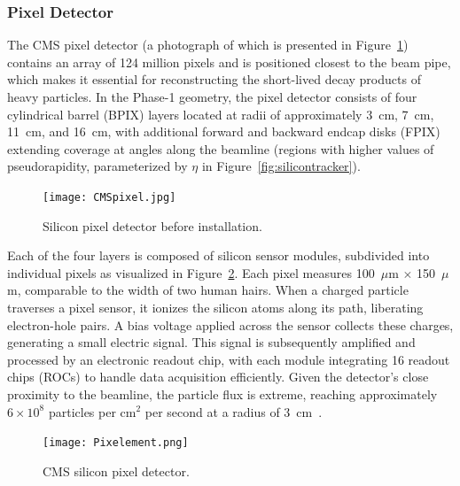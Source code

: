 \subsubsection{Pixel Detector}

The CMS pixel detector (a photograph of which is presented in Figure~\ref{fig:CMSpixel}) contains an array of 124 million pixels and is positioned closest to the beam pipe, which makes it essential for reconstructing the short-lived decay products of heavy particles. In the Phase-1 geometry, the pixel detector consists of four cylindrical barrel (BPIX) layers located at radii of approximately 3~cm, 7~cm, 11~cm, and 16~cm, with additional forward and backward endcap disks (FPIX) extending coverage at angles along the beamline (regions with higher values of pseudorapidity, parameterized by $\eta$ in Figure~\ref{fig:silicontracker}).

\begin{figure}[!hbt]
    \begin{center}
        \texttt{[image: CMSpixel.jpg]}
        \caption{Silicon pixel detector before installation.}
        \label{fig:CMSpixel}
    \end{center}
\end{figure}

Each of the four layers is composed of silicon sensor modules, subdivided into individual pixels as visualized in Figure~\ref{fig:Pixelement}. Each pixel measures 100~$\mu$m $\times$ 150~$\mu$m, comparable to the width of two human hairs. When a charged particle traverses a pixel sensor, it ionizes the silicon atoms along its path, liberating electron-hole pairs. A bias voltage applied across the sensor collects these charges, generating a small electric signal. This signal is subsequently amplified and processed by an electronic readout chip, with each module integrating 16 readout chips (ROCs) to handle data acquisition efficiently. Given the detector’s close proximity to the beamline, the particle flux is extreme, reaching approximately $6 \times 10^8$ particles per cm$^2$ per second at a radius of 3~cm~\cite{The_CMS_Collaboration_2008}.

\begin{figure}[!hbt]
    \begin{center}
        \texttt{[image: Pixelement.png]}
        \caption{CMS silicon pixel detector.}
        \label{fig:Pixelement}
    \end{center}
\end{figure}


